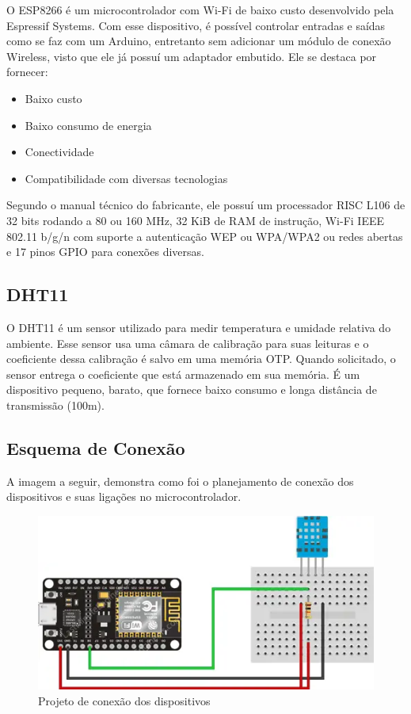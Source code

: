 \documentclass[12pt]{article}
\begin{document}
O ESP8266 é um microcontrolador com Wi-Fi de baixo custo desenvolvido pela Espressif Systems. Com esse dispositivo, é possível controlar entradas e saídas como se faz com um Arduino, entretanto sem adicionar um módulo de conexão Wireless, visto que ele já possuí um adaptador embutido. Ele se destaca por fornecer:

\begin{itemize}
  \item Baixo custo
  \item Baixo consumo de energia
  \item Conectividade
  \item Compatibilidade com diversas tecnologias
\end{itemize}

Segundo o manual técnico do fabricante, ele possuí um processador RISC L106 de 32 bits rodando a 80 ou 160 MHz, 32 KiB de RAM de instrução, Wi-Fi IEEE 802.11 b/g/n com suporte a autenticação WEP ou WPA/WPA2 ou redes abertas e 17 pinos GPIO para conexões diversas.

\subsection{DHT11}

O DHT11 é um sensor utilizado para medir temperatura e umidade relativa do ambiente. Esse sensor usa uma câmara de calibração para suas leituras e o coeficiente dessa calibração é salvo em uma memória OTP. Quando solicitado, o sensor entrega o coeficiente que está armazenado em sua memória. É um dispositivo pequeno, barato, que fornece baixo consumo e longa distância de transmissão (100m).

\subsection{Esquema de Conexão}

A imagem a seguir, demonstra como foi o planejamento de conexão dos dispositivos e suas ligações no microcontrolador. 

\begin{figure}[ht]
  \centering
  \includegraphics[width=.6\textwidth]{assets/img/schema.png}
  \caption{Projeto de conexão dos dispositivos}
\end{figure}
\end{document}
